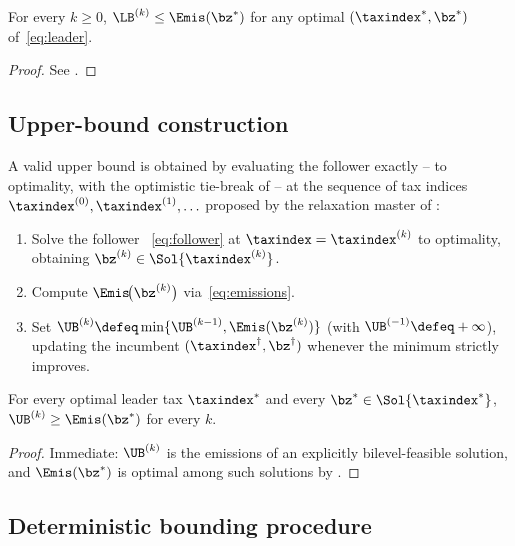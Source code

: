 \begin{lemma}\label{lem:lb_validity}
For every $k\ge0$, $\LB^{(k)}\le\Emis(\bz^{*})$ for any optimal
$(\taxindex^{*},\bz^{*})$ of~\eqref{eq:leader}.
\end{lemma}

\begin{proof}
See .
\end{proof}

\subsection{Upper-bound construction}
\label{sec:method:ub}

A valid upper bound is obtained by evaluating the follower exactly --
to \MILP optimality, with the optimistic tie-break of 
-- at the sequence of tax indices $\taxindex^{(0)},\taxindex^{(1)},\ldots$
proposed by the relaxation master of :
\begin{enumerate}
  \item Solve the follower \MIP~\eqref{eq:follower} at
        $\taxindex=\taxindex^{(k)}$ to optimality, obtaining
        $\bz^{(k)}\in\Sol{\taxindex^{(k)}}$.
  \item Compute $\Emis\!\bigl(\bz^{(k)}\bigr)$ via~\eqref{eq:emissions}.
  \item Set $\UB^{(k)}\defeq\min\{\UB^{(k-1)},\Emis(\bz^{(k)})\}$
        (with $\UB^{(-1)}\defeq+\infty$), updating the incumbent
        $(\taxindex^{\dagger},\bz^{\dagger})$ whenever the minimum
        strictly improves.
\end{enumerate}

\begin{lemma}\label{lem:ub_validity}
For every optimal leader tax $\taxindex^{*}$ and every
$\bz^{*}\in\Sol{\taxindex^{*}}$, $\UB^{(k)} \ge \Emis(\bz^{*})$ for
every $k$.
\end{lemma}

\begin{proof}
Immediate: $\UB^{(k)}$ is the emissions of an explicitly
bilevel-feasible solution, and $\Emis(\bz^{*})$ is optimal among such
solutions by .
\end{proof}

\subsection{Deterministic bounding procedure}
\label{sec:method:dbp}

